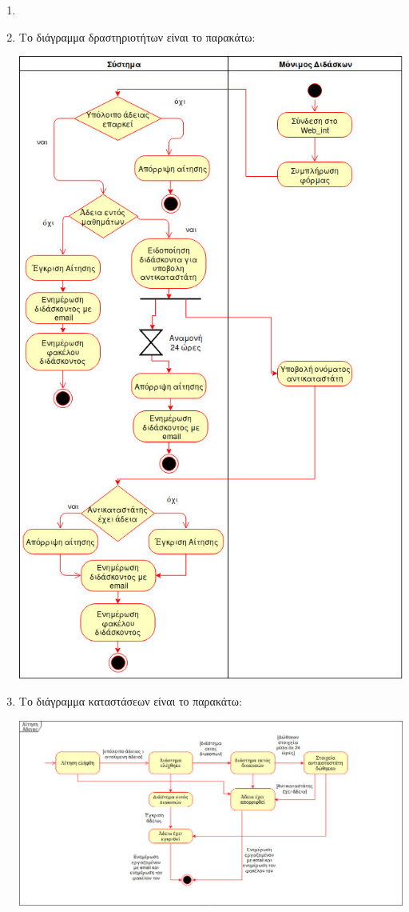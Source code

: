 \documentclass[12pt]{article}
\begin{document}
\begin{enumerate}
\item

\item
Το διάγραμμα δραστηριοτήτων είναι το παρακάτω:\\
\begin{center}
\includegraphics[scale=0.5]{activity}
\end{center}

\item
Το διάγραμμα καταστάσεων είναι το παρακάτω:\\
\begin{center}
\includegraphics[scale=0.4]{state_diag}
\end{center}


\end{enumerate}
\end{document}
